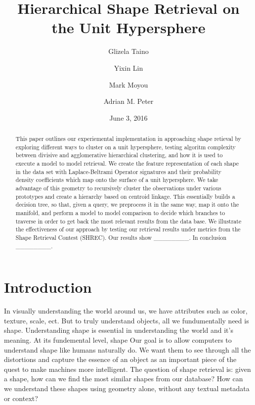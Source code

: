 \documentclass{article}
\begin{document}
\title{Hierarchical Shape Retrieval on the Unit Hypersphere}
\author{Glizela Taino}
\author{Yixin Lin}
\author{Mark Moyou}
\author{Adrian M. Peter}
\setcounter{Maxaffil}{0}
\renewcommand\Affilfont{\itshape\small}
\date{June 3, 2016}
\maketitle

\begin{abstract}
This paper outlines our experiemental implementation in approaching shape retieval by exploring different ways to cluster on a unit hypersphere, testing algoritm complexity between divisive and agglomerative hierarchical clustering, and how it is used to execute a model to model retrieval. We create the feature representation of each shape in the data set with Laplace-Beltrami Operator signatures and their probability density coefficients which map onto the surface of a unit hypersphere. We take advantage of this geometry to recursively cluster the observations under various prototypes and create a hierarchy based on centroid linkage. This essentially builds a decision tree, so that, given a query, we preprocess it in the same way, map it onto the manifold, and perform a model to model comparison to decide which branches to traverse in order to get back the most relevant results from the data base. We illustrate the effectiveness of our approach by testing our retrieval results under metrics from the Shape Retrieval Contest (SHREC). Our results show \_\_\_\_\_\_\_\_. In conclusion \_\_\_\_\_\_\_\_.\end{abstract}

\section*{Introduction}
In visually understanding the world around us, we have attributes such as color, texture, scale, ect. But to truly understand objects, all we fundumentally need is shape. Understanding shape is essential in understanding the world and it's meaning. At its fundemental level, shape Our goal is to allow computers to understand shape like humans naturally do. We want them to see through all the distortions and capture the essence of an object as an important piece of the quest to make machines more intelligent. The question of shape retrieval is: given a shape, how can we find the most similar shapes from our database? How can we understand these shapes using geometry alone, without any textual metadata or context? 
\end{document}
